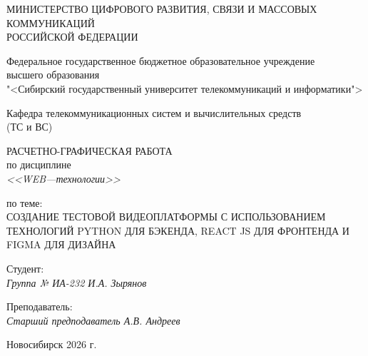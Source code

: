 \thispagestyle{empty}

\begin{center}
    МИНИСТЕРСТВО ЦИФРОВОГО РАЗВИТИЯ, СВЯЗИ И МАССОВЫХ КОММУНИКАЦИЙ \\ РОССИЙСКОЙ ФЕДЕРАЦИИ

    \vspace{20pt}

    Федеральное государственное бюджетное образовательное учреждение  \\  высшего образования \\
    "<Сибирский государственный университет телекоммуникаций и информатики"> \\

    \vspace{20pt}

    Кафедра телекоммуникационных систем и вычислительных средств \\  (ТС и ВС)
\end{center}

\vfill

\begin{center}
    РАСЧЕТНО-ГРАФИЧЕСКАЯ РАБОТА \\
    по дисциплине \\
    \textit{<<WEB---технологии>>}

    \vspace{20pt}

    по теме: \\
    \uppercase{Создание тестовой видеоплатформы с использованием технологий Python
    для бэкенда, React JS для фронтенда и Figma для дизайна}
\end{center}

\vfill

\noindent Студент: \\
\textit{Группа № ИА-232 \hfill И.А. Зырянов}

\vspace{20pt}

\noindent Преподаватель: \\
\textit{Старший предподаватель \hfill А.В. Андреев}

\vfill

\begin{center}
    Новосибирск 2026 г.
\end{center}